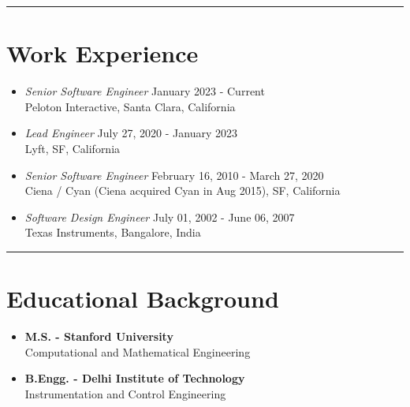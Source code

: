 \documentclass[line, 11pt]{res}
\renewenvironment{resume}{\begingroup}{\endgroup}
\begin{document}
\begin{resume}
\vspace{5pt}
\hrule

\vspace{-7pt}

\section{Work Experience}
    \begin{itemize}
        \item{\sl Senior Software Engineer} \hfill January 2023 - Current\\
        Peloton Interactive, Santa Clara, California

        \item{\sl Lead Engineer} \hfill July 27, 2020 - January 2023\\
        Lyft, SF, California

    
        \item{\sl Senior Software Engineer} \hfill February 16, 2010 - March 27, 2020\\
        Ciena / Cyan (Ciena acquired Cyan in Aug 2015), SF, California


        \item{\sl Software Design Engineer} \hfill July 01, 2002 - June 06, 2007\\
        Texas Instruments, Bangalore, India\\
    \end{itemize}

\hrule

\vspace{-7pt}
\section{Educational Background}
    \begin{itemize}
        \item \textbf{M.S. - Stanford University} \\
        Computational and Mathematical Engineering
        \item \textbf{B.Engg. - Delhi Institute of Technology} \\
        Instrumentation and Control Engineering\\
    \end{itemize}


\end{resume}
\end{document}

